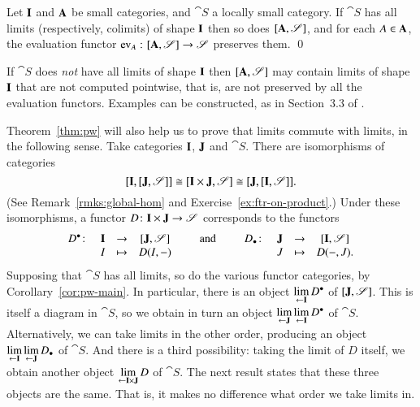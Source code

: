 \begin{cor}     
\label{cor:pw-main}
Let $\mathbf{I}$ and $\mathbf{A}$ be small categories, and $\cat{S}$ a locally
small category.  If $\cat{S}$ has all limits (respectively, colimits) of
shape $\mathbf{I}$ then so does $[\mathbf{A},\mathscr{S}]$, and for each $A
\in \mathbf{A}$, the evaluation functor $\ev_A\from
\ftrcat{\scat{A}}{\cat{S}} \to \cat{S}$ preserves them.
\qed
\end{cor}

\begin{warning}
If $\cat{S}$ does \emph{not} have all limits of shape $\mathbf{I}$ then
$[\mathbf{A},\mathscr{S}]$ may contain limits of shape $\mathbf{I}$
that are not%
%
%
computed pointwise, that is, are not preserved by all the evaluation
functors.  Examples can be constructed, as in Section~3.3 of \citeKel.
\end{warning}

Theorem~\ref{thm:pw} will also help us to prove that limits commute with
limits, in the following sense.  Take categories $\mathbf{I}$, $\mathbf{J}$ and
$\cat{S}$.  There are isomorphisms of categories
\[
[\mathbf{I},[\mathbf{J},\mathscr{S}]]
\cong 
[\mathbf{I} \times \mathbf{J},\mathscr{S}]
\cong
[\mathbf{J},[\mathbf{I},\mathscr{S}]].
\]
(See Remark~\ref{rmks:global-hom} and
Exercise~\ref{ex:ftr-on-product}.)  Under these isomorphisms, a functor
$D\from \scat{I} \times \scat{J} \to \cat{S}$ corresponds to the functors
\[
\begin{array}[t]{cccc}
D^\bl\from  &\scat{I}       &\to    &\ftrcat{\scat{J}}{\cat{S}}    \\
        &I              &\mapsto&D(I, \dashbk)
\end{array}
% 
\qquad \text{and} \qquad
% 
\begin{array}[t]{cccc}
D_\bl\from  &\scat{J}       &\to    &\ftrcat{\scat{I}}{\cat{S}}    \\
        &J              &\mapsto&D(\dashbk, J).
\end{array}%
%
\ntn{D-upper-lower}
%
\]
Supposing that $\cat{S}$ has all limits, so do the various functor
categories, by Corollary~\ref{cor:pw-main}.  In particular, there is an
object $\lim\limits_{\leftarrow \mathbf{I}} D^\bullet$ of $[\mathbf{J},\mathscr{S}]$.  This is
itself a diagram in $\cat{S}$, so we obtain in turn an object
$\lim\limits_{\leftarrow \mathbf{J}} \lim\limits_{\leftarrow \mathbf{I}} D^\bullet$ of $\cat{S}$.  Alternatively, we can
take limits in the other order, producing an object $\lim\limits_{\leftarrow \mathbf{I}}
\lim\limits_{\leftarrow \mathbf{J}} D_\bullet$ of $\cat{S}$.  And there is a third possibility:
taking the limit of $D$ itself, we obtain another object $\lim\limits_{\leftarrow \mathbf{I}
  \times \mathbf{J}} D$ of $\cat{S}$.  The next result states that these
three objects are the same.  That is, it makes no difference what order we
take limits in.

